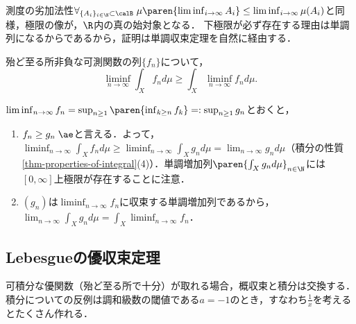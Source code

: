 \documentclass[uplatex, dvipdfmx]{jsreport}
\begin{document}
\begin{tcolorbox}[colframe=ForestGreen, colback=ForestGreen!10!white,breakable,colbacktitle=ForestGreen!40!white,coltitle=black,fonttitle=\bfseries\sffamily,
title=]
    測度の劣加法性$\forall_{\{A_i\}_{i\in\N}\subset\calB}\;\mu\paren{\liminf_{i\to\infty}A_i}\le\liminf_{i\to\infty}\mu(A_i)$と同様，極限の像が，$\R$内の真の始対象となる．
    下極限が必ず存在する理由は単調列になるからであるから，証明は単調収束定理を自然に経由する．
\end{tcolorbox}

\begin{theorem}[Fatou (1906)]
    殆ど至る所非負な可測関数の列$\{f_n\}$について，
    \[\liminf_{n\to\infty}\int_Xf_nd\mu\ge\int_X\liminf_{n\to\infty}f_nd\mu.\]
\end{theorem}
\begin{Proof}
    $\liminf_{n\to\infty}f_n=\sup_{n\ge 1}\paren{\inf_{k\ge n}f_k}=:\sup_{n\ge 1}g_n$とおくと，
    \begin{enumerate}
        \item $f_n\ge g_n\;\ae$と言える．よって，$\liminf_{n\to\infty}\int_Xf_nd\mu\ge\liminf_{n\to\infty}\int_Xg_nd\mu=\lim_{n\to\infty}g_nd\mu$（積分の性質\ref{thm-properties-of-integral}(4)）．単調増加列$\paren{\int_Xg_nd\mu}_{n\in\N}$には$[0,\infty]$上極限が存在することに注意．
        \item  $(g_n)$は$\liminf_{n\to\infty}f_n$に収束する単調増加列であるから，$\lim_{n\to\infty}\int_Xg_nd\mu=\int_X\liminf_{n\to\infty}f_n$．
    \end{enumerate}
\end{Proof}

\subsection{Lebesgueの優収束定理}

\begin{tcolorbox}[colframe=ForestGreen, colback=ForestGreen!10!white,breakable,colbacktitle=ForestGreen!40!white,coltitle=black,fonttitle=\bfseries\sffamily,
title=]
    可積分な優関数（殆ど至る所で十分）が取れる場合，概収束と積分は交換する．
    積分についての反例は調和級数の閾値である$a=-1$のとき，すなわち$\frac{1}{x}$を考えるとたくさん作れる．
\end{tcolorbox}
\end{document}
